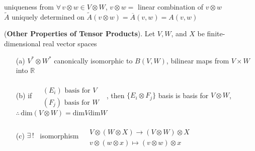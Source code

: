 uniqueness from $\forall \, v \otimes w \in V \otimes W$, $v\otimes w =$ linear combination of $v\otimes w$ \\
$\widetilde{A}$ uniquely determined on $\widetilde{A}(v\otimes w) = \overline{A}(v,w) = A(v,w)$


\begin{proposition}[11.4] (\textbf{Other Properties of Tensor Products}).  Let $V, W$, and $X$ be finite-dimensional real vector spaces 
\begin{enumerate}
  \item[(a)] $V^* \otimes W^*$ canonically isomorphic to $B(V,W)$, bilinear maps from $V\times W$ into $\mathbb{R}$
  \item[(b)] if $\begin{aligned} & \quad \\ & (E_i) \text{ basis for $V$ } \\ & (F_j) \text{ basis for $W$ } \end{aligned}$, then $\lbrace E_i \otimes F_j \rbrace$ basis is basis for $V\otimes W$, $\therefore \, \text{dim}{(V\otimes W)} = \text{dim}{V} \text{dim}{W}$
  \item[(c)] $\exists \, !$ \, isomorphism $\begin{aligned} & \quad \\ & V\otimes (W\otimes X) \to (V \otimes W) \otimes X \\ & v\otimes (w \otimes x) \mapsto (v\otimes w)\otimes x \end{aligned}$
\end{enumerate}
\end{proposition}




